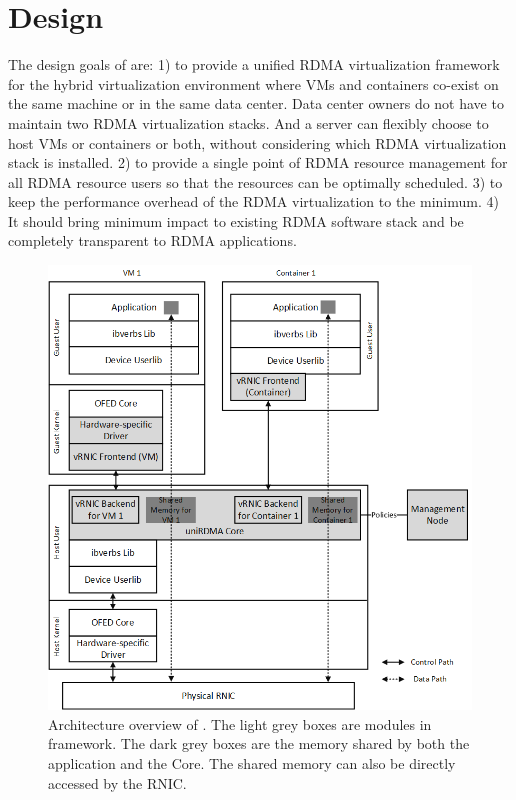 \section{Design} \label{design}

The design goals of \sys are:
1) to provide a unified RDMA virtualization framework for the hybrid virtualization environment where VMs and containers co-exist on the same machine or in the same data center. Data center owners do not have to maintain two RDMA virtualization stacks. And a server can flexibly choose to host VMs or containers or both, without considering which RDMA virtualization stack is installed.
2) to provide a single point of RDMA resource management for all RDMA resource users so that the resources can be optimally scheduled.
3) to keep the performance overhead of the RDMA virtualization to the minimum.
4) It should bring minimum impact to existing RDMA software stack and be completely transparent to RDMA applications.

\begin{figure}[!ht]
	\centering
	\includegraphics[width=1\linewidth]{images/framework-overview.png}
	\caption{Architecture overview of \sys. The light grey boxes are modules in \sys framework. The dark grey boxes are the memory shared by both the application and the \sys Core. The shared memory can also be directly accessed by the RNIC.}
	\label{fig:framework-overview}
\end{figure}

